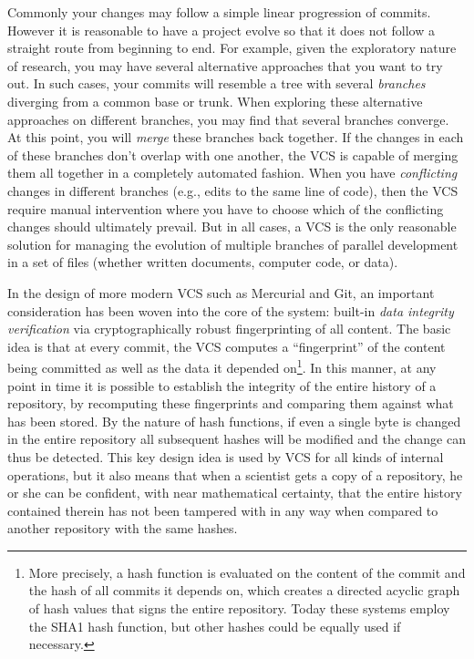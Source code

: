 \documentclass[ChapterTOCs,krantz2]{krantz} %
\begin{document}
Commonly your changes may follow a simple linear progression of commits.
However it is reasonable to have a project evolve so that it does not follow a
straight route from beginning to end. For example, given the exploratory nature
of research, you may have several alternative approaches that you want to try
out. In such cases, your commits will resemble a tree with several
\emph{branches} diverging from a common base or trunk. When exploring these
alternative approaches on different branches, you may find that several
branches converge. At this point, you will \emph{merge} these
branches back together.  If the changes in each of these branches don't overlap
with one another, the VCS is capable of merging them all together in a
completely automated fashion.  When you have \emph{conflicting} changes in
different branches (e.g., edits to the same line of code), then the VCS
require manual intervention where you have to choose which of the conflicting
changes should ultimately prevail.  But in all cases, a VCS is the only
reasonable solution for managing the evolution of multiple branches of parallel
development in a set of files (whether written documents, computer code, or
data).

In the design of more modern VCS such as Mercurial and Git, an important
consideration has been woven into the core of the system: built-in \emph{data
  integrity verification} via cryptographically robust fingerprinting of all
content.  The basic idea is that at every commit, the VCS computes a
``fingerprint'' of the content being committed as well as the data it depended
on\footnote{More precisely, a hash function is evaluated on the content of the
  commit and the hash of all commits it depends on, which creates a directed
  acyclic graph of hash values that signs the entire repository.  Today these
  systems employ the SHA1 hash function, but other hashes could be equally used
  if necessary.}.  In this manner, at any point in time it is possible to
establish the integrity of the entire history of a repository, by recomputing
these fingerprints and comparing them against what has been stored.  By the
nature of hash functions, if even a single byte is changed in the entire
repository all subsequent hashes will be modified and the change can thus be
detected.  This key design idea is used by VCS for all kinds of internal
operations, but it also means that when a scientist gets a copy of a
repository, he or she can be confident, with near mathematical certainty, that
the entire history contained therein has not been tampered with in any way when
compared to another repository with the same hashes.  
\end{document}
